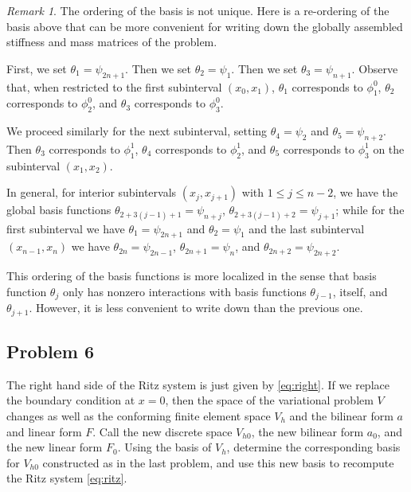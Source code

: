 \documentclass{article}
\theoremstyle{definition}
\theoremstyle{plain}
\theoremstyle{remark}
\newtheorem{remark}{Remark}
\begin{document}
\begin{remark}
  The ordering of the basis is not unique. 
  Here is a re-ordering of the basis above that can be more convenient for writing down the globally assembled stiffness and mass matrices of the problem.

  First, we set $\theta_1 = \psi_{2n+1}$.
  Then we set $\theta_2 = \psi_1$.
  Then we set $\theta_3 = \psi_{n+1}$.
  Observe that, when restricted to the first subinterval $(x_0,x_1)$, $\theta_1$ corresponds to $\phi_1^0$, $\theta_2$ corresponds to $\phi_2^0$, and $\theta_3$ corresponds to $\phi_3^0$.

  We proceed similarly for the next subinterval, setting $\theta_4 = \psi_2$ and $\theta_5 = \psi_{n+2}$.
  Then $\theta_3$ corresponds to $\phi_1^1$, $\theta_4$ corresponds to $\phi_2^1$, and $\theta_5$ corresponds to $\phi_3^1$ on the subinterval $(x_1,x_2)$.

  In general, for interior subintervals $(x_j,x_{j+1})$ with $1 \leq j \leq n-2$, we have the global basis functions $\theta_{2 + 3(j-1) + 1} = \psi_{n+j}$, $\theta_{2 + 3(j-1) + 2} = \psi_{j+1}$; while for the first subinterval we have $\theta_1 = \psi_{2n+1}$ and $\theta_2 = \psi_1$ and the last subinterval $(x_{n-1},x_n)$ we have $\theta_{2n} = \psi_{2n-1}$, $\theta_{2n+1} = \psi_n$, and $\theta_{2n+2} = \psi_{2n+2}$.

  This ordering of the basis functions is more localized in the sense that basis function $\theta_j$ only has nonzero interactions with basis functions $\theta_{j-1}$, itself, and $\theta_{j+1}$.
  However, it is less convenient to write down than the previous one.
\end{remark}

\subsection{Problem 6}
The right hand side of the Ritz system is just given by \eqref{eq:right}.
If we replace the boundary condition at $x = 0$, then the space of the variational problem $V$ changes as well as the conforming finite element space $V_h$ and the bilinear form $a$ and linear form $F$.
Call the new discrete space $V_{h0}$, the new bilinear form $a_0$, and the new linear form $F_0$.
Using the basis of $V_h$, determine the corresponding basis for $V_{h0}$ constructed as in the last problem, and use this new basis to recompute the Ritz system \eqref{eq:ritz}.
\end{document}
